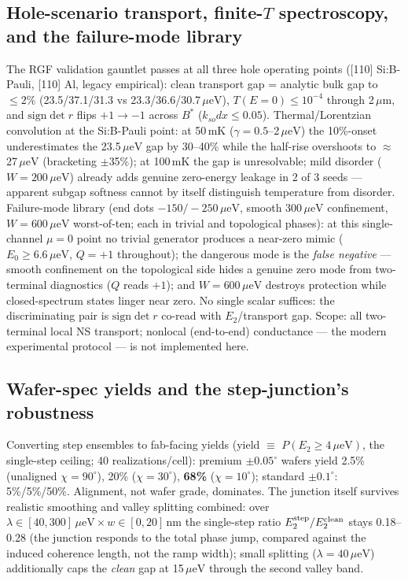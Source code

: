 \documentclass[11pt]{article}
\newcommand{\ueV}{\,\mu\mathrm{eV}}
\begin{document}
\subsection{Hole-scenario transport, finite-$T$ spectroscopy, and the
failure-mode library}\label{s:holetrans}
The RGF validation gauntlet passes at all three hole operating points
([110] Si:B-Pauli, [110] Al, legacy empirical): clean transport gap =
analytic bulk gap to $\le 2\%$ (23.5/37.1/31.3 vs 23.3/36.6/30.7$\ueV$),
$T(E{=}0) \le 10^{-4}$ through 2\,$\mu$m, and $\mathrm{sign}\det r$ flips
$+1 \to -1$ across $B^*$ ($k_{so}dx \le 0.05$). Thermal/Lorentzian
convolution at the Si:B-Pauli point: at 50\,mK ($\gamma = 0.5$--2$\ueV$)
the 10\%-onset underestimates the 23.5$\ueV$ gap by 30--40\% while the
half-rise overshoots to $\approx$27$\ueV$ (bracketing $\pm$35\%); at
100\,mK the gap is unresolvable; mild disorder ($W = 200\ueV$) already
adds genuine zero-energy leakage in 2 of 3 seeds --- apparent subgap
softness cannot by itself distinguish temperature from disorder.
Failure-mode library (end dots $-150/-250\ueV$, smooth 300$\ueV$
confinement, $W = 600\ueV$ worst-of-ten; each in trivial and topological
phases): at this single-channel $\mu = 0$ point no trivial generator
produces a near-zero mimic ($E_0 \ge 6.6\ueV$, $Q = +1$ throughout);
the dangerous mode is the \emph{false negative} --- smooth confinement on
the topological side hides a genuine zero mode from two-terminal
diagnostics ($Q$ reads $+1$); and $W = 600\ueV$ destroys protection while
closed-spectrum states linger near zero. No single scalar suffices: the
discriminating pair is $\mathrm{sign}\det r$ co-read with $E_2$/transport
gap. Scope: all two-terminal local NS transport; nonlocal (end-to-end)
conductance --- the modern experimental protocol --- is not implemented
here.

\subsection{Wafer-spec yields and the step-junction's robustness}
\label{s:yield}
Converting step ensembles to fab-facing yields (yield $\equiv$
$P(E_2 \ge 4\ueV)$, the single-step ceiling; 40 realizations/cell):
premium $\pm0.05^\circ$ wafers yield 2.5\% (unaligned $\chi = 90^\circ$),
20\% ($\chi = 30^\circ$), \textbf{68\%} ($\chi = 10^\circ$); standard
$\pm0.1^\circ$: 5\%/5\%/50\%. Alignment, not wafer grade, dominates. The
junction itself survives realistic smoothing and valley splitting
combined: over $\lambda \in [40, 300]\ueV \times w \in [0, 20]$\,nm the
single-step ratio $E_2^{\rm step}/E_2^{\rm clean}$ stays 0.18--0.28
(the junction responds to the total phase jump, compared against the
induced coherence length, not the ramp width); small splitting
($\lambda = 40\ueV$) additionally caps the \emph{clean} gap at 15$\ueV$
through the second valley band.
\end{document}
